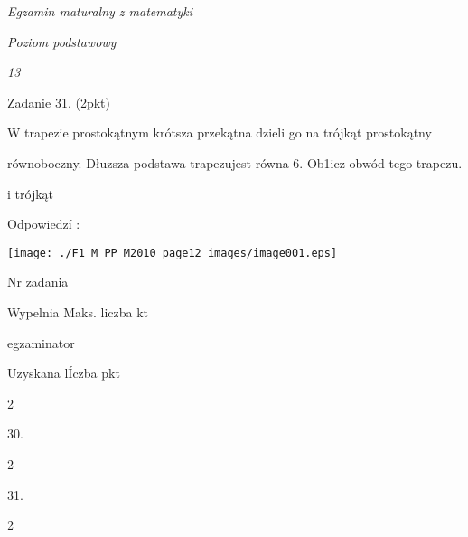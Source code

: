 \documentclass[a4paper,12pt]{article}
\begin{document}
{\it Egzamin maturalny z matematyki}

{\it Poziom podstawowy}

{\it 13}

Zadanie 31. (2pkt)

W trapezie prostokątnym krótsza przekątna dzieli go na trójkąt prostokątny

równoboczny. Dłuzsza podstawa trapezujest równa 6. Ob1icz obwód tego trapezu.

i trójkąt

Odpowiedzí :
\begin{center}
\texttt{[image: ./F1\_M\_PP\_M2010\_page12\_images/image001.eps]}
\end{center}
Nr zadania

Wypelnia Maks. liczba kt

egzaminator

Uzyskana lÍczba pkt

2

30.

2

31.

2
\end{document}
